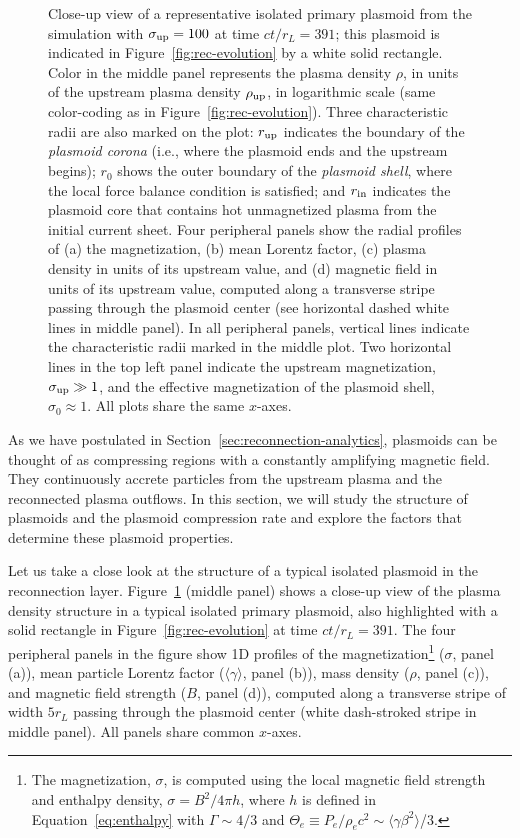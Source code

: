 \begin{figure}[htb]
{    }{
        \caption{Close-up view of a representative isolated primary plasmoid from the simulation with $\sigma_{\rm up}=100$ at time $ct/r_L=391$; this plasmoid is indicated in Figure~\ref{fig:rec-evolution} by a white solid rectangle. Color in the middle panel represents the plasma density $\rho$, in units of the upstream plasma density $\rho_{\rm up}$, in logarithmic scale (same color-coding as in Figure~\ref{fig:rec-evolution}). Three characteristic radii are also marked on the plot: $r_{\rm up}$ indicates the boundary of the {\it plasmoid corona} (i.e., where the plasmoid ends and the upstream begins); $r_0$ shows the outer boundary of the {\it plasmoid shell}, where the local force balance condition is satisfied; and $r_{\rm in}$ indicates the plasmoid core that contains hot unmagnetized plasma from the initial current sheet. Four peripheral panels show the radial profiles of (a) the magnetization, (b) mean Lorentz factor, (c) plasma density in units of its upstream value, and (d) magnetic field in units of its upstream value, computed along a transverse stripe passing through the plasmoid center (see horizontal dashed white lines in middle panel). In all peripheral panels, vertical lines indicate the characteristic radii marked in the middle plot. Two horizontal lines in the top left panel indicate the upstream magnetization, $\sigma_{\rm up} \gg 1$, and the effective magnetization of the plasmoid shell, $\sigma_0 \approx 1$. All plots share the same $x$-axes.}
        \label{fig:rec-plasm_example}
    }
\end{figure}

As we have postulated in Section~\ref{sec:reconnection-analytics}, plasmoids can be thought of as compressing regions with a constantly amplifying magnetic field. They continuously accrete particles from the upstream plasma and the reconnected plasma outflows. In this section, we will study the structure of plasmoids and the plasmoid compression rate and explore the factors that determine these plasmoid properties. 

Let us take a close look at the structure of a typical isolated plasmoid in the reconnection layer. Figure~\ref{fig:rec-plasm_example} (middle panel) shows a close-up view of the plasma density structure in a typical isolated primary plasmoid, also highlighted with a solid rectangle in Figure~\ref{fig:rec-evolution} at time $ct/r_L = 391$. The four peripheral panels in the figure show 1D profiles of the magnetization\footnote{
The magnetization, $\sigma$, is computed using the local {magnetic field strength and} enthalpy density, $\sigma = B^2 / 4\pi h$, where  $h$ is defined in Equation~\eqref{eq:enthalpy} with $\Gamma\sim 4/3$ and $\Theta_e\equiv P_e/\rho_ec^2 \sim \langle\gamma\beta^2\rangle$/3.}
($\sigma$, panel (a)), mean particle Lorentz factor ($\langle\gamma\rangle$, panel (b)), mass density ($\rho$, panel (c)), and magnetic field strength ($B$, panel (d)), computed along a transverse stripe of width $5r_L$ passing through the plasmoid center (white dash-stroked stripe in middle panel). 
All panels share common $x$-axes. 

